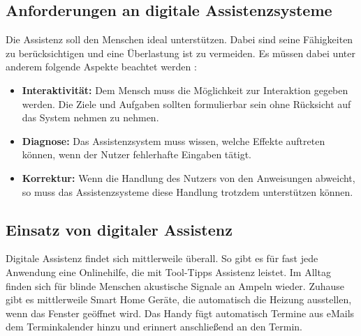 \subsection{Anforderungen an digitale Assistenzsysteme}
Die Assistenz soll den Menschen ideal unterstützen. Dabei sind seine Fähigkeiten zu berücksichtigen und eine Überlastung ist zu vermeiden. Es müssen dabei unter anderem folgende Aspekte beachtet werden \cite{Ludwig}:
\begin{itemize}
\item \textbf{Interaktivität:} Dem Mensch muss die Möglichkeit zur Interaktion gegeben werden. Die Ziele und Aufgaben sollten formulierbar sein ohne Rücksicht auf das System nehmen zu nehmen.
\item \textbf{Diagnose:} Das Assistenzsystem muss wissen, welche Effekte auftreten können, wenn der Nutzer fehlerhafte Eingaben tätigt.
\item \textbf{Korrektur:} Wenn die Handlung des Nutzers von den Anweisungen abweicht, so muss das Assistenzsysteme diese Handlung trotzdem unterstützen können.
\end{itemize}

\subsection{Einsatz von digitaler Assistenz}
Digitale Assistenz findet sich mittlerweile überall. So gibt es für fast jede Anwendung eine Onlinehilfe, die mit Tool-Tipps Assistenz leistet. Im Alltag finden sich für blinde Menschen akustische Signale an Ampeln wieder. Zuhause gibt es mittlerweile Smart Home Geräte, die automatisch die Heizung ausstellen, wenn das Fenster geöffnet wird. Das Handy fügt automatisch Termine aus eMails dem Terminkalender hinzu und erinnert anschließend an den Termin.

